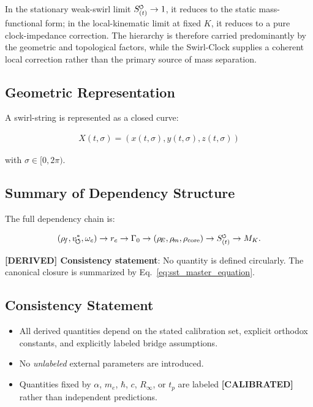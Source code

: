 \documentclass[11pt]{article}
\theoremstyle{definition}
\theoremstyle{plain}
\theoremstyle{remark}
\newcommand{\swirlarrow}{\mathchoice{\mkern-2mu\scriptstyle\boldsymbol{\circlearrowleft}}{\mkern-2mu\scriptstyle\boldsymbol{\circlearrowleft}}{\mkern-2mu\scriptscriptstyle\boldsymbol{\circlearrowleft}}{\mkern-2mu\scriptscriptstyle\boldsymbol{\circlearrowleft}}}
\newcommand{\rhoF}{{\rho_{\!f}}}
\newcommand{\rhoE}{\rho_{\!E}}
\newcommand{\rhoM}{\rho_{\!m}}
\newcommand{\rhocore}{\rho_{\mathrm{core}}}
\newcommand{\SwirlClock}{{S_{(t)}^{\swirlarrow}}}
\newcommand{\rc}{{r_c}}
\newcommand{\vchar}{v_{\!\boldsymbol{\circlearrowleft}}^{\ast}}
\begin{document}
        In the stationary weak-swirl limit $\SwirlClock \to 1$, it reduces to the static mass-functional form; in the local-kinematic limit at fixed $K$, it reduces to a pure clock-impedance correction. The hierarchy is therefore carried predominantly by the geometric and topological factors, while the Swirl-Clock supplies a coherent local correction rather than the primary source of mass separation.

    \subsection{Geometric Representation}
        
        A swirl-string is represented as a closed curve:
        
        \begin{align}
            X(t,\sigma) = (x(t,\sigma), y(t,\sigma), z(t,\sigma))
        \end{align}
        
        with $\sigma \in [0,2\pi)$.
    
    \subsection{Summary of Dependency Structure}
        
        The full dependency chain is:
        
        \begin{align}
        (\rhoF, \vchar, \omega_c)
            \rightarrow \rc
            \rightarrow \Gamma_0
            \rightarrow (\rhoE, \rhoM, \rhocore)
            \rightarrow \SwirlClock
            \rightarrow M_K.
        \end{align}
        
        \textbf{[DERIVED] Consistency statement}:
        No quantity is defined circularly. The canonical closure is summarized by Eq.~\ref{eq:sst_master_equation}.
    
    \subsection{Consistency Statement}
        
        \begin{itemize}
            \item All derived quantities depend on the stated calibration set, explicit orthodox constants, and explicitly labeled bridge assumptions.
            \item No \emph{unlabeled} external parameters are introduced.
            \item Quantities fixed by $\alpha$, $m_e$, $\hbar$, $c$, $R_\infty$, or $t_p$ are labeled \textbf{[CALIBRATED]} rather than independent predictions.
        \end{itemize}
    
\end{document}
